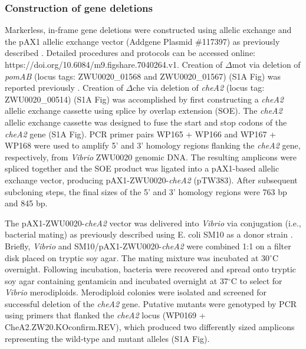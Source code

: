 {{{{{{{\subsubsection{Construction of gene deletions}
Markerless, in-frame gene deletions were constructed using allelic exchange and the pAX1 allelic exchange vector (Addgene Plasmid \#117397) as previously described \cite{wiles_modernized_2018}. Detailed procedures and protocols can be accessed online: https://doi.org/10.6084/m9.figshare.7040264.v1. Creation of $\Delta$mot via deletion of \textit{\textit{pomAB}} (locus tags: ZWU0020\_01568 and ZWU0020\_01567) (S1A Fig) was reported previously \cite{wiles_modernized_2018}. Creation of $\Delta$che via deletion of \textit{cheA2} (locus tag: ZWU0020\_00514) (S1A Fig) was accomplished by first constructing a \textit{cheA2} allelic exchange cassette using splice by overlap extension (SOE). The \textit{cheA2} allelic exchange cassette was designed to fuse the start and stop codons of the \textit{cheA2} gene (S1A Fig). PCR primer pairs WP165 + WP166 and WP167 + WP168 were used to amplify 5' and 3' homology regions flanking the \textit{cheA2} gene, respectively, from \textit{Vibrio} ZWU0020 genomic DNA. The resulting amplicons were spliced together and the SOE product was ligated into a pAX1-based allelic exchange vector, producing pAX1-ZWU0020-\textit{cheA2} (pTW383). After subsequent subcloning steps, the final sizes of the 5' and 3' homology regions were 763 bp and 845 bp.   

The pAX1-ZWU0020-\textit{cheA2} vector was delivered into \textit{Vibrio} via conjugation (i.e., bacterial mating) as previously described using E. coli SM10 as a donor strain \cite{wiles_modernized_2018}. Briefly, \textit{Vibrio} and SM10/pAX1-ZWU0020-\textit{cheA2} were combined 1:1 on a filter disk placed on tryptic soy agar. The mating mixture was incubated at 30$^\circ$C overnight. Following incubation, bacteria were recovered and spread onto tryptic soy agar containing gentamicin and incubated overnight at 37$^\circ$C to select for \textit{Vibrio} merodiploids. Merodiploid colonies were isolated and screened for successful deletion of the \textit{cheA2} gene. Putative mutants were genotyped by PCR using primers that flanked the \textit{cheA2} locus (WP0169 + CheA2.ZW20.KOconfirm.REV), which produced two differently sized amplicons representing the wild-type and mutant alleles (S1A Fig). 

}}}}}}}

